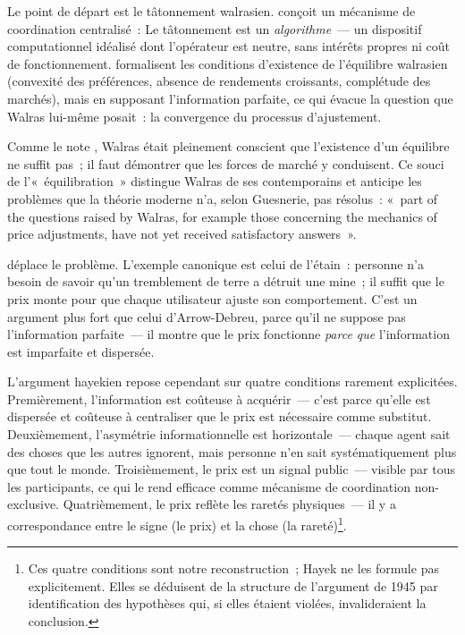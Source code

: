 Le point de départ est le tâtonnement walrasien. \textcite{walras_elements_1874} conçoit un mécanisme de coordination centralisé~:  Le tâtonnement est un \emph{algorithme}~--- un dispositif computationnel idéalisé dont l'opérateur est neutre, sans intérêts propres ni coût de fonctionnement. \textcite{arrow_debreu_1954} formalisent les conditions d'existence de l'équilibre walrasien (convexité des préférences, absence de rendements croissants, complétude des marchés), mais en supposant l'information parfaite, ce qui évacue la question que Walras lui-même posait~: la convergence du processus d'ajustement.

Comme le note \textcite{guesnerie_modernity_2011}, Walras était pleinement conscient que l'existence d'un équilibre ne suffit pas~; il faut démontrer que les forces de marché y conduisent. Ce souci de l'«~équilibration~» distingue Walras de ses contemporains et anticipe les problèmes que la théorie moderne n'a, selon Guesnerie, pas résolus~: «~part of the questions raised by Walras, for example those concerning the mechanics of price adjustments, have not yet received satisfactory answers~».

\textcite{hayek_use_1945} déplace le problème.  L'exemple canonique est celui de l'étain~: personne n'a besoin de savoir qu'un tremblement de terre a détruit une mine~; il suffit que le prix monte pour que chaque utilisateur ajuste son comportement. C'est un argument plus fort que celui d'Arrow-Debreu, parce qu'il ne suppose pas l'information parfaite~--- il montre que le prix fonctionne \emph{parce que} l'information est imparfaite et dispersée.

L'argument hayekien repose cependant sur quatre conditions rarement explicitées. Premièrement, l'information est coûteuse à acquérir~--- c'est parce qu'elle est dispersée et coûteuse à centraliser que le prix est nécessaire comme substitut. Deuxièmement, l'asymétrie informationnelle est horizontale~--- chaque agent sait des choses que les autres ignorent, mais personne n'en sait systématiquement plus que tout le monde. Troisièmement, le prix est un signal public~--- visible par tous les participants, ce qui le rend efficace comme mécanisme de coordination non-exclusive. Quatrièmement, le prix reflète les raretés physiques~--- il y a correspondance entre le signe (le prix) et la chose (la rareté)\footnote{Ces quatre conditions sont notre reconstruction~; Hayek ne les formule pas explicitement. Elles se déduisent de la structure de l'argument de 1945 par identification des hypothèses qui, si elles étaient violées, invalideraient la conclusion.}.

